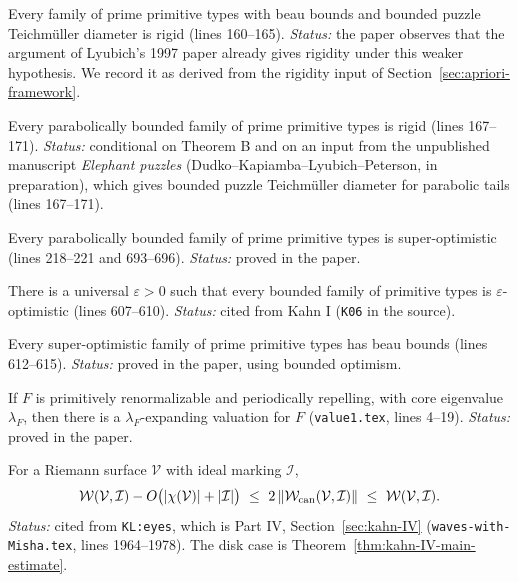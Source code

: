\begin{theorem}[Theorem B]
\label{thm:kkl-B}
Every family of prime primitive types with beau bounds and bounded puzzle Teichm\"uller diameter is rigid
(lines 160--165).  \emph{Status:} the paper observes that the argument of Lyubich's 1997 paper already gives rigidity
under this weaker hypothesis.  We record it as derived from the rigidity input of Section~\ref{sec:apriori-framework}.
\end{theorem}

\begin{theorem}[Theorem C]
\label{thm:kkl-C}
Every parabolically bounded family of prime primitive types is rigid (lines 167--171).  \emph{Status:} conditional on
Theorem B and on an input from the unpublished manuscript \emph{Elephant puzzles} (Dudko--Kapiamba--Lyubich--Peterson,
in preparation), which gives bounded puzzle Teichm\"uller diameter for parabolic tails (lines 167--171).
\end{theorem}

\begin{theorem}[Theorem D]
\label{thm:kkl-D}
Every parabolically bounded family of prime primitive types is super-optimistic (lines 218--221 and 693--696).
\emph{Status:} proved in the paper.
\end{theorem}

\begin{theorem}
\label{thm:kkl-bounded-optimism}
There is a universal $\varepsilon>0$ such that every bounded family of primitive types is $\varepsilon$-optimistic
(lines 607--610).  \emph{Status:} cited from Kahn I (\texttt{K06} in the source).
\end{theorem}

\begin{theorem}
\label{thm:kkl-asymptotic}
Every super-optimistic family of prime primitive types has beau bounds (lines 612--615).  \emph{Status:} proved in the
paper, using bounded optimism.
\end{theorem}

\begin{theorem}
\label{thm:kkl-value}
If $F$ is primitively renormalizable and periodically repelling, with core eigenvalue $\lambda_F$, then there is a
$\lambda_F$-expanding valuation for $F$ (\texttt{value1.tex}, lines 4--19).  \emph{Status:} proved in the paper.
\end{theorem}

\begin{theorem}
\label{thm:kkl-thick-thin}
For a Riemann surface $\mathcal V$ with ideal marking $\mathcal I$,
\[
\mathcal W(\mathcal V,\mathcal I)-O\bigl(|\chi(\mathcal V)|+|\mathcal I|\bigr)\ \le\ 2\,\|\mathcal W_{\rm can}(\mathcal V,\mathcal I)\|\ \le\ \mathcal W(\mathcal V,\mathcal I).
\]
\emph{Status:} cited from \texttt{KL:eyes}, which is Part IV, Section~\ref{sec:kahn-IV} (\texttt{waves-with-Misha.tex}, lines
1964--1978).  The disk case is Theorem~\ref{thm:kahn-IV-main-estimate}.
\end{theorem}

